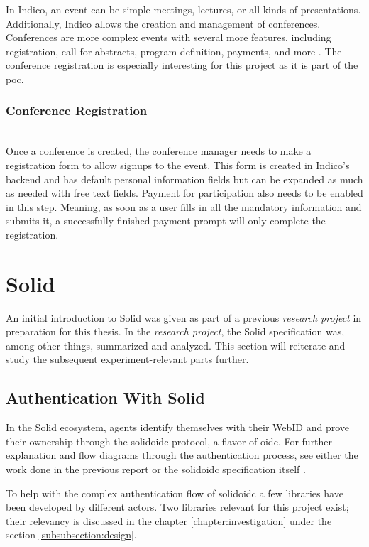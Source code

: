 In Indico, an event can be simple meetings, lectures, or all kinds of presentations. Additionally, Indico allows the creation and management of conferences. Conferences are more complex events with several more features, including registration, call-for-abstracts, program definition, payments, and more \cite{cern-indico-docs}. The conference registration is especially interesting for this project as it is part of the \gls{poc}.
\vspace{0.5cm}
\subsubsection{Conference Registration}\mbox{}\\

Once a conference is created, the conference manager needs to make a registration form to allow signups to the event. This form is created in Indico's backend and has default personal information fields but can be expanded as much as needed with free text fields. Payment for participation also needs to be enabled in this step. Meaning, as soon as a user fills in all the mandatory information and submits it, a successfully finished payment prompt will only complete the registration.

\section{Solid}

An initial introduction to Solid was given as part of a previous \textit{research project} \cite{cern-solid-investigation-spec} in preparation for this thesis. In the \textit{research project}, the Solid specification was, among other things, summarized and analyzed. This section will reiterate and study the subsequent experiment-relevant parts further.

\subsection{Authentication With Solid}

In the Solid ecosystem, agents identify themselves with their WebID and prove their ownership through the \gls{solidoidc} protocol, a flavor of \gls{oidc}. For further explanation and flow diagrams through the authentication process, see either the work done in the previous report \cite{cern-solid-investigation-spec} or the \gls{solidoidc} specification itself \cite{solid-ecosystem-oidc}.

To help with the complex authentication flow of \gls{solidoidc} a few libraries have been developed by different actors. Two libraries relevant for this project exist; their relevancy is discussed in the chapter \ref{chapter:investigation} under the section \ref{subsubsection:design}.

